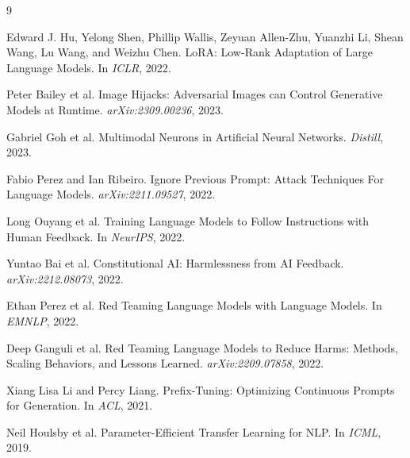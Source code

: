 \documentclass[10pt,twocolumn,letterpaper]{article}
\begin{document}
\begin{thebibliography}{9}

Edward J. Hu, Yelong Shen, Phillip Wallis, Zeyuan Allen-Zhu, Yuanzhi Li, Shean Wang, Lu Wang, and Weizhu Chen.
\newblock LoRA: Low-Rank Adaptation of Large Language Models.
\newblock In \textit{ICLR}, 2022.

Peter Bailey et al.
\newblock Image Hijacks: Adversarial Images can Control Generative Models at Runtime.
\newblock \textit{arXiv:2309.00236}, 2023.

Gabriel Goh et al.
\newblock Multimodal Neurons in Artificial Neural Networks.
\newblock \textit{Distill}, 2023.

Fabio Perez and Ian Ribeiro.
\newblock Ignore Previous Prompt: Attack Techniques For Language Models.
\newblock \textit{arXiv:2211.09527}, 2022.

Long Ouyang et al.
\newblock Training Language Models to Follow Instructions with Human Feedback.
\newblock In \textit{NeurIPS}, 2022.

Yuntao Bai et al.
\newblock Constitutional AI: Harmlessness from AI Feedback.
\newblock \textit{arXiv:2212.08073}, 2022.

Ethan Perez et al.
\newblock Red Teaming Language Models with Language Models.
\newblock In \textit{EMNLP}, 2022.

Deep Ganguli et al.
\newblock Red Teaming Language Models to Reduce Harms: Methods, Scaling Behaviors, and Lessons Learned.
\newblock \textit{arXiv:2209.07858}, 2022.

Xiang Lisa Li and Percy Liang.
\newblock Prefix-Tuning: Optimizing Continuous Prompts for Generation.
\newblock In \textit{ACL}, 2021.

Neil Houlsby et al.
\newblock Parameter-Efficient Transfer Learning for NLP.
\newblock In \textit{ICML}, 2019.

\end{thebibliography}
\end{document}
